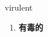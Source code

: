 
\begin{frame}
{\huge virulent}
\begin{center}
\begin{enumerate}\Large
  \item \textbf{有毒的}
\end{enumerate}
\end{center}
\end{frame}

